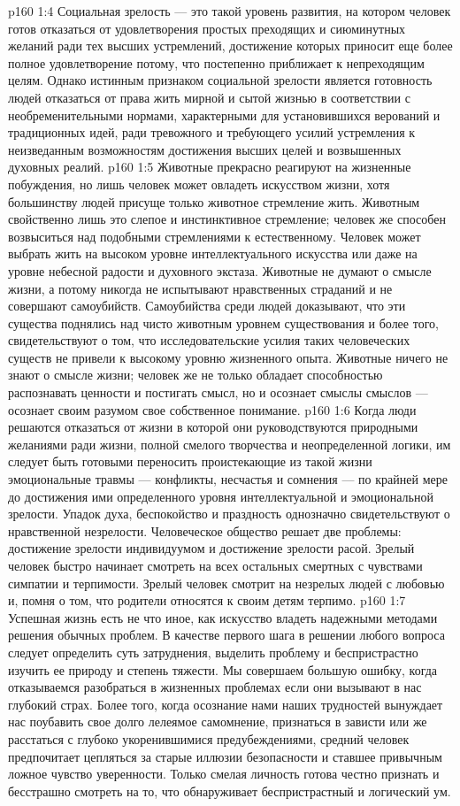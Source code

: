 \vs p160 1:4 Социальная зрелость --- это такой уровень развития, на котором человек готов отказаться от удовлетворения простых преходящих и сиюминутных желаний ради тех высших устремлений, достижение которых приносит еще более полное удовлетворение потому, что постепенно приближает к непреходящим целям. Однако истинным признаком социальной зрелости является готовность людей отказаться от права жить мирной и сытой жизнью в соответствии с необременительными нормами, характерными для установившихся верований и традиционных идей, ради тревожного и требующего усилий устремления к неизведанным возможностям достижения высших целей и возвышенных духовных реалий.
\vs p160 1:5 Животные прекрасно реагируют на жизненные побуждения, но лишь человек может овладеть искусством жизни, хотя большинству людей присуще только животное стремление жить. Животным свойственно лишь это слепое и инстинктивное стремление; человек же способен возвыситься над подобными стремлениями к естественному. Человек может выбрать жить на высоком уровне интеллектуального искусства или даже на уровне небесной радости и духовного экстаза. Животные не думают о смысле жизни, а потому никогда не испытывают нравственных страданий и не совершают самоубийств. Самоубийства среди людей доказывают, что эти существа поднялись над чисто животным уровнем существования и более того, свидетельствуют о том, что исследовательские усилия таких человеческих существ не привели к высокому уровню жизненного опыта. Животные ничего не знают о смысле жизни; человек же не только обладает способностью распознавать ценности и постигать смысл, но и осознает смыслы смыслов --- осознает своим разумом свое собственное понимание.
\vs p160 1:6 Когда люди решаются отказаться от жизни в которой они руководствуются природными желаниями ради жизни, полной смелого творчества и неопределенной логики, им следует быть готовыми переносить проистекающие из такой жизни эмоциональные травмы --- конфликты, несчастья и сомнения --- по крайней мере до достижения ими определенного уровня интеллектуальной и эмоциональной зрелости. Упадок духа, беспокойство и праздность однозначно свидетельствуют о нравственной незрелости. Человеческое общество решает две проблемы: достижение зрелости индивидуумом и достижение зрелости расой. Зрелый человек быстро начинает смотреть на всех остальных смертных с чувствами симпатии и терпимости. Зрелый человек смотрит на незрелых людей с любовью и, помня о том, что родители относятся к своим детям терпимо.
\vs p160 1:7 Успешная жизнь есть не что иное, как искусство владеть надежными методами решения обычных проблем. В качестве первого шага в решении любого вопроса следует определить суть затруднения, выделить проблему и беспристрастно изучить ее природу и степень тяжести. Мы совершаем большую ошибку, когда отказываемся разобраться в жизненных проблемах если они вызывают в нас глубокий страх. Более того, когда осознание нами наших трудностей вынуждает нас поубавить свое долго лелеямое самомнение, признаться в зависти или же расстаться с глубоко укоренившимися предубеждениями, средний человек предпочитает цепляться за старые иллюзии безопасности и ставшее привычным ложное чувство уверенности. Только смелая личность готова честно признать и бесстрашно смотреть на то, что обнаруживает беспристрастный и логический ум.
